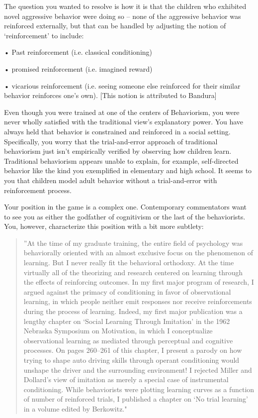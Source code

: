 \begin{refsection}
The question you wanted to resolve is how it is that the children who exhibited novel aggressive behavior were doing so – none of the aggressive behavior was reinforced externally, but that can be handled by adjusting the notion of `reinforcement' to include:

• Past reinforcement (i.e. classical conditioning)

• promised reinforcement (i.e. imagined reward)

• vicarious reinforcement (i.e. seeing someone else reinforced for their similar behavior reinforces one's own). [This notion is attributed to Bandura]

Even though you were trained at one of the centers of Behaviorism, you were never wholly satisfied with the traditional view's explanatory power. You have always held that behavior is constrained and reinforced in a social setting. Specifically, you worry that the trial-and-error approach of traditional behaviorism just isn't empirically verified by observing how children learn. Traditional behaviorism appears unable to explain, for example, self-directed behavior like the kind you exemplified in elementary and high school. It seems to you that children model adult behavior without a trial-and-error with reinforcement process.

Your position in the game is a complex one. Contemporary commentators want to see you as either the godfather of cognitivism or the last of the behaviorists. You, however, characterize this position with a bit more subtlety:

\begin{quote}

”At the time of my graduate training, the entire field of psychology was behaviorally oriented with an almost exclusive focus on the phenomenon of learning. But I never really fit the behavioral orthodoxy. At the time virtually all of the theorizing and research centered on learning through the effects of reinforcing outcomes. In my first major program of research, I argued against the primacy of conditioning in favor of observational learning, in which people neither emit responses nor receive reinforcements during the process of learning. Indeed, my first major publication was a lengthy chapter on `Social Learning Through Imitation' in the 1962 Nebraska Symposium on Motivation, in which I conceptualize observational learning as mediated through perceptual and cognitive processes. On pages 260--261 of this chapter, I present a parody on how trying to shape auto driving skills through operant conditioning would unshape the driver and the surrounding environment! I rejected Miller and Dollard's view of imitation as merely a special case of instrumental conditioning. While behaviorists were plotting learning curves as a function of number of reinforced trials, I published a chapter on `No trial learning' in a volume edited by Berkowitz."


\end{quote}
\end{refsection}

